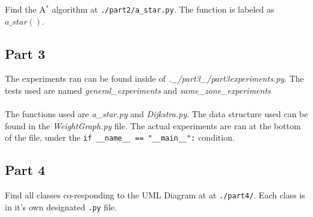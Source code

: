 \documentclass{article}
\begin{document}
Find the A$^{*}$ algorithm at \verb|./part2/a_star.py|. The function is labeled as $a\_star()$.

\subsection{Part 3}

The experiments ran can be found inside of \emph{.\_/part3\_/part3experiments.py}. The tests used are named \emph{general\_experiments} and \emph{same\_zone\_experiments} \\
\\
The functions used are \emph{a\_star.py} and \emph{Dijkstra.py}. The data structure used can be found in the \emph{WeightGraph.py} file. The actual experiments are ran at the bottom of the file, under the \verb|if __name__ == "__main__":| condition.

\subsection{Part 4}


Find all classes co-responding to the UML Diagram at at \verb|./part4/|. Each class is in it's own designated \verb|.py| file.
\end{document}
